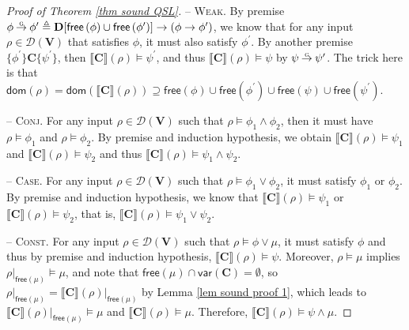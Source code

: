 \documentclass[conference,compsoc, 10pt]{IEEEtran}
\newcommand {\cD } {{\mathcal{D}}}
\newcommand {\bD} {{\mathbf{D}}}
\newcommand {\dom }[1] {{\mathsf{dom}\!\left(#1\right)}}
\newcommand {\free }[1] {{\mathsf{free}\left(#1\right)}}
\newcommand {\rt }[2] {{\left.{#1}\right|_{#2}}}
\newcommand {\vars } {\mathbf{V}}
\newcommand {\var } {\mathsf{var}}
\newcommand {\prog } {{\mathbf{C}}}
\newcommand {\sem}[1] {\llbracket#1\rrbracket}
\DeclareRobustCommand{\gimp}{%
	\mathbin{\ooalign{$\rightarrow$\cr\hss\raisebox{1ex}{\scalebox{.5}{G}}\hss}}}
\begin{document}
\begin{appendices}
\begin{proof}[Proof of Theorem \ref{thm sound QSL}]
			\vspace{0.4cm}
			
			\noindent -- \textsc{Weak}. By premise $\phi\gimp\phi^\prime \triangleq \bD[\free{\phi}\cup\free{\phi^\prime}]\rightarrow(\phi\rightarrow\phi^\prime)$, we know that for any input $\rho\in\cD(\vars)$ that satisfies $\phi$, it must also satisfy $\phi^\prime$. By another premise $\{\phi^{\prime}\}\prog\{\psi^{\prime}\}$, then $\sem{\prog}(\rho)\models\psi^{\prime}$, and thus $\sem{\prog}(\rho)\models\psi$ by $\psi\gimp\psi^\prime$. The trick here is that $\dom{\rho} = \dom{\sem{\prog}(\rho)} \supseteq \free{\phi}\cup\free{\phi^\prime} \cup \free{\psi}\cup\free{\psi^\prime}$.
			
			\vspace{0.4cm}
			
			\noindent -- \textsc{Conj}. For any input $\rho\in\cD(\vars)$ such that $\rho\models\phi_1\wedge\phi_2$, then it must have $\rho\models\phi_1$ and $\rho\models\phi_2$. By premise and induction hypothesis, we obtain $\sem{\prog}(\rho)\models\psi_1$ and $\sem{\prog}(\rho)\models\psi_2$ and thus $\sem{\prog}(\rho)\models\psi_1\wedge\psi_2$.
			
			\vspace{0.4cm}
			
			\noindent -- \textsc{Case}. For any input $\rho\in\cD(\vars)$ such that $\rho\models\phi_1\vee\phi_2$, it must satisfy $\phi_1$ or $\phi_2$. By premise and induction hypothesis, we know that $\sem{\prog}(\rho)\models\psi_1$ or $\sem{\prog}(\rho)\models\psi_2$, that is, $\sem{\prog}(\rho)\models\psi_1\vee\psi_2$.
			
			\vspace{0.4cm}
			
			\noindent -- \textsc{Const}. For any input $\rho\in\cD(\vars)$ such that $\rho\models\phi\vee\mu$, it must satisfy $\phi$ and thus by premise and induction hypothesis, $\sem{\prog}(\rho)\models\psi$. Moreover, $\rho\models\mu$ implies  $\rt{\rho}{\free{\mu}}\models\mu$, and note that $\free{\mu}\cap\var(\prog) = \emptyset$, so $\rt{\rho}{\free{\mu}} = \rt{\sem{\prog}(\rho)}{\free{\mu}}$ by Lemma \ref{lem sound proof 1}, which leads to $\rt{\sem{\prog}(\rho)}{\free{\mu}}\models\mu$ and $\sem{\prog}(\rho)\models\mu$. Therefore, $\sem{\prog}(\rho)\models\psi\wedge\mu$.
			
			\vspace{0.4cm}
			

\end{proof}
\end{appendices}
\end{document}
